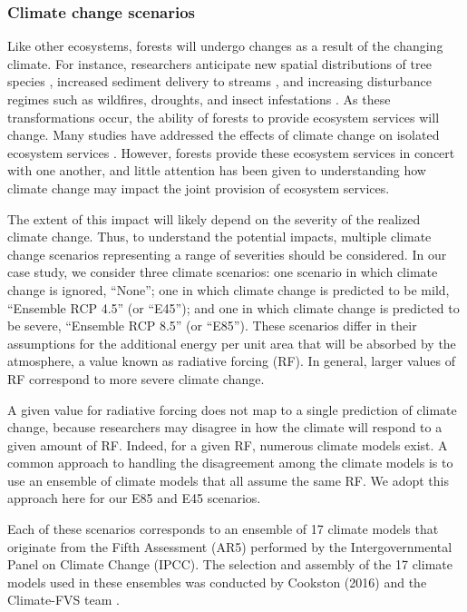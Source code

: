 \subsubsection{Climate change scenarios}
\label{sec:climateChange}
Like other ecosystems, forests will undergo changes as a result of the changing climate. For instance, researchers anticipate new spatial distributions of tree species \cite{iverson1998predicting}, increased sediment delivery to streams \cite{Goode20121}, and increasing disturbance regimes such as wildfires, droughts, and insect infestations \cite{vose2012effects}. As these transformations occur, the ability of forests to provide ecosystem services will change. Many studies have addressed the effects of climate change on isolated ecosystem services \cite{vose2012effects}\cite{bonan2008forests}\cite{mckenzie2004climatic}. However, forests provide these ecosystem services in concert with one another, and little attention has been given to understanding how climate change may impact the joint provision of ecosystem services.

The extent of this impact will likely depend on the severity of the realized climate change. Thus, to understand the potential impacts, multiple climate change scenarios representing a range of severities should be considered. In our case study, we consider three climate scenarios: one scenario in which climate change is ignored, ``None''; one in which climate change is predicted to be mild, ``Ensemble RCP 4.5'' (or ``E45''); and one in which climate change is predicted to be severe, ``Ensemble RCP 8.5'' (or ``E85''). These scenarios differ in their assumptions for the additional energy per unit area that will be absorbed by the atmosphere, a value known as radiative forcing (RF). In general, larger values of RF correspond to more severe climate change.

A given value for radiative forcing does not map to a single prediction of climate change, because researchers may disagree in how the climate will respond to a given amount of RF. Indeed, for a given RF, numerous climate models exist. A common approach to handling the disagreement among the climate models is to use an ensemble of climate models that all assume the same RF. We adopt this approach here for our E85 and E45 scenarios.

Each of these scenarios corresponds to an ensemble of 17 climate models that originate from the Fifth Assessment (AR5) performed by the Intergovernmental Panel on Climate Change (IPCC). The selection and assembly of the 17 climate models used in these ensembles was conducted by Cookston (2016) and the Climate-FVS team \cite{ClimateModelsInFVSEnsemble}.

